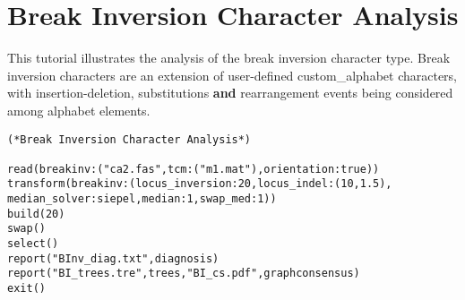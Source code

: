 
\section{Break Inversion Character Analysis}{\label{tutorial 13}}

This tutorial illustrates the analysis of the break inversion character type.  
Break inversion characters are an extension of user-defined \poyargument 
{custom\_alphabet} characters, with insertion-deletion, substitutions {\bf and} 
rearrangement events being considered among alphabet elements.

\begin{verbatim}
(*Break Inversion Character Analysis*)

read(breakinv:("ca2.fas",tcm:("m1.mat"),orientation:true))
transform(breakinv:(locus_inversion:20,locus_indel:(10,1.5),
median_solver:siepel,median:1,swap_med:1))
build(20)
swap()
select()
report("BInv_diag.txt",diagnosis)
report("BI_trees.tre",trees,"BI_cs.pdf",graphconsensus)
exit()
\end{verbatim}

